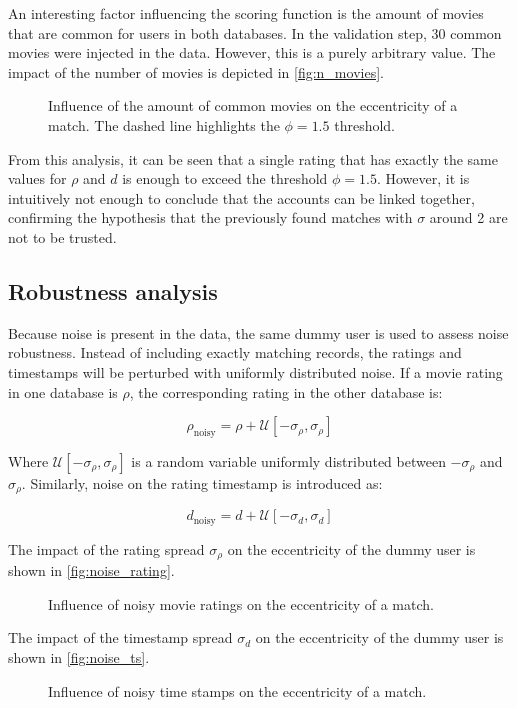 An interesting factor influencing the scoring function is the amount of movies that are common for users in both databases. In the validation step, 30 common movies were injected in the data. However, this is a purely arbitrary value. The impact of the number of movies is depicted in \autoref{fig:n_movies}.

\begin{figure}[h]
	\centering
	
	\caption{Influence of the amount of common movies on the eccentricity of a match. The dashed line highlights the $\phi = 1.5$ threshold.}
	\label{fig:n_movies}
\end{figure}

From this analysis, it can be seen that a single rating that has exactly the same values for $\rho$ and $d$ is enough to exceed the threshold $\phi = 1.5$. However, it is intuitively not enough to conclude that the accounts can be linked together, confirming the hypothesis that the previously found matches with $\sigma$ around 2 are not to be trusted.

\subsection{Robustness analysis}

Because noise is present in the data, the same dummy user is used to assess noise robustness. Instead of including exactly matching records, the ratings and timestamps will be perturbed with uniformly distributed noise. If a movie rating in one database is $\rho$, the corresponding rating in the other database is:

\begin{equation}
	\rho_{\text{noisy}} = \rho + \mathcal{U}\left[-\sigma_{\rho}, \sigma_{\rho}\right]
\end{equation}

Where $\mathcal{U}\left[-\sigma_{\rho}, \sigma_{\rho}\right]$ is a random variable uniformly distributed between $-\sigma_{\rho}$ and $\sigma_{\rho}$. Similarly, noise on the rating timestamp is introduced as:

\begin{equation}
d_{\text{noisy}} = d + \mathcal{U}\left[-\sigma_{d}, \sigma_{d}\right]
\end{equation}

The impact of the rating spread $\sigma_{\rho}$ on the eccentricity of the dummy user is shown in \autoref{fig:noise_rating}.

\begin{figure}[h]
	\centering
	
	\caption{Influence of noisy movie ratings on the eccentricity of a match.}
	\label{fig:noise_rating}
\end{figure}

The impact of the timestamp spread $\sigma_{d}$ on the eccentricity of the dummy user is shown in \autoref{fig:noise_ts}.

\begin{figure}[h]
	\centering
	
	\caption{Influence of noisy time stamps on the eccentricity of a match.}
	\label{fig:noise_ts}
\end{figure}